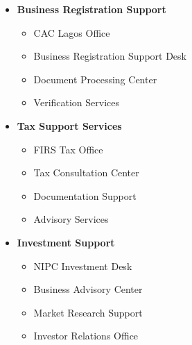 \begin{tcolorbox}[
    colback=white,
    colframe=primarydark,
    title=\textbf{Lagos Region},
    before skip=1em,
    after skip=1em
]
    \begin{itemize}[leftmargin=*,itemsep=0.5em]
        \item \textbf{Business Registration Support}
        \begin{itemize}[itemsep=0.3em]
            \item CAC Lagos Office
            \item Business Registration Support Desk
            \item Document Processing Center
            \item Verification Services
        \end{itemize}

        \vspace{0.5em}

        \item \textbf{Tax Support Services}
        \begin{itemize}[itemsep=0.3em]
            \item FIRS Tax Office
            \item Tax Consultation Center
            \item Documentation Support
            \item Advisory Services
        \end{itemize}

        \vspace{0.5em}

        \item \textbf{Investment Support}
        \begin{itemize}[itemsep=0.3em]
            \item NIPC Investment Desk
            \item Business Advisory Center
            \item Market Research Support
            \item Investor Relations Office
        \end{itemize}
    \end{itemize}
\end{tcolorbox}

